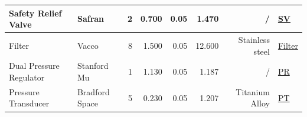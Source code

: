 \begin{table}[h]
{\begin{tabular}{|l|l|r|r|r|r|r|l|}
\hline
Safety Relief Valve                                            & Safran                                                   & 2                                                        & 0.700                                                                                             & 0.05                                 & 1.470                                                                                          & /                        & \href{https://www.safran-group.com/products-services/safety-relief-valve-ssei}{SV}                                                                                                                                                      \\ 
\hline
Filter                                                         & {\cellcolor[rgb]{1,0.831,0.541}}Vacco                    & 8                                                        & 1.500                                                                                             & 0.05                                 & 12.600                                                                                         & Stainless steel          & \href{https://www.vacco.com/images/uploads/pdfs/VACCO\_Filtration\_Catalog\_042121\_FINAL\_with\_bookmarks\_web.pdf}{Filter}                                                                                                                \\ 
\hline
Dual Pressure Regulator                                        & {\cellcolor[rgb]{1,0.831,0.541}}Stanford Mu              & 1                                                        & 1.130                                                                                             & 0.05                                 & 1.187                                                                                          & /                        & \href{https://stanfordmu.com/feature-works/}{PR}                                                                                                                                                                                        \\ 
\hline
Pressure Transducer                                            & {\cellcolor[rgb]{1,0.831,0.541}}Bradford Space           & 5                                                        & 0.230                                                                                             & 0.05                                 & 1.207                                                                                          & Titanium Alloy           & \href{https://static1.squarespace.com/static/603ed12be884730013401d7a/t/6054f46fbaf06f76bbaba605/1616180337738/be\_datasheet\_sapt\_2019oct.pdf}{PT}                                                                                    \\ 

\end{tabular}}
\end{table}
